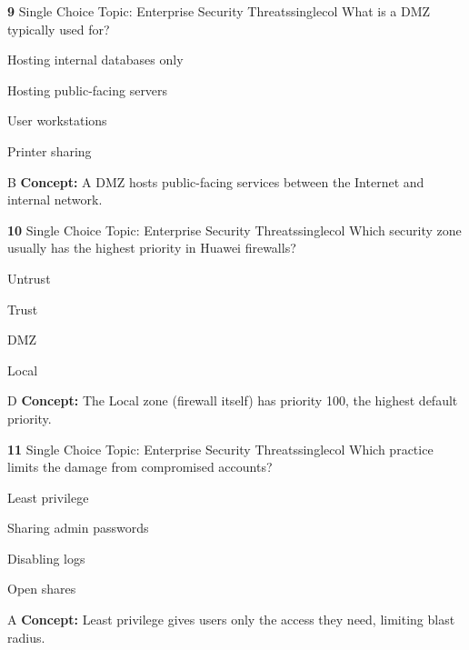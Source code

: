 \documentclass[10pt,a4paper]{article}
\begin{document}
\begin{qcard}{\color{white}\textbf{9} \hfill \small Single Choice \textbar{} Topic: Enterprise Security Threats}{singlecol}
What is a DMZ typically used for?

\begin{qoptions}
\item Hosting internal databases only
\item Hosting public-facing servers
\item User workstations
\item Printer sharing
\end{qoptions}
\begin{explainbox}{B}
\textbf{Concept:} A DMZ hosts public-facing services between the Internet and internal network.
\end{explainbox}
\end{qcard}

\begin{qcard}{\color{white}\textbf{10} \hfill \small Single Choice \textbar{} Topic: Enterprise Security Threats}{singlecol}
Which security zone usually has the highest priority in Huawei firewalls?

\begin{qoptions}
\item Untrust
\item Trust
\item DMZ
\item Local
\end{qoptions}
\begin{explainbox}{D}
\textbf{Concept:} The Local zone (firewall itself) has priority 100, the highest default priority.
\end{explainbox}
\end{qcard}

\begin{qcard}{\color{white}\textbf{11} \hfill \small Single Choice \textbar{} Topic: Enterprise Security Threats}{singlecol}
Which practice limits the damage from compromised accounts?

\begin{qoptions}
\item Least privilege
\item Sharing admin passwords
\item Disabling logs
\item Open shares
\end{qoptions}
\begin{explainbox}{A}
\textbf{Concept:} Least privilege gives users only the access they need, limiting blast radius.
\end{explainbox}
\end{qcard}
\end{document}
